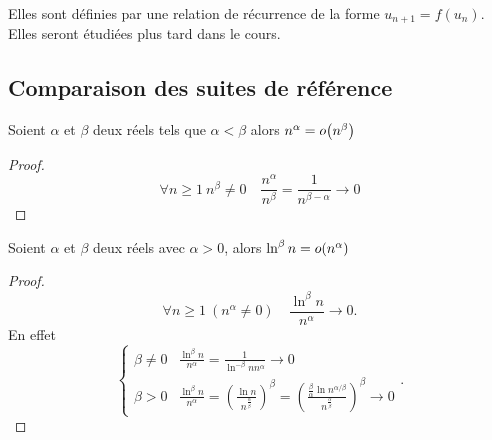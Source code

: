 Elles sont définies par une relation de récurrence de la forme \(u_{n+1}=f(u_n)\). Elles seront étudiées plus tard dans le cours.

\subsection{Comparaison des suites de référence}

\begin{prop}
  Soient \(\alpha\) et \(\beta\) deux réels tels que \(\alpha < \beta\) alors \(n^\alpha = o\mathopen{}\left(n^\beta\right)\)
\end{prop}
\begin{proof}
  \begin{equation}
    \forall n \geqslant 1 \ n^\beta \neq 0 \quad \frac{n^\alpha}{n^\beta}=\frac{1}{n^{\beta-\alpha}} \rightarrow 0
  \end{equation}
\end{proof}

\begin{prop}
  Soient \(\alpha\) et \(\beta\) deux réels avec \(\alpha>0\), alors \(\ln^\beta n = o\mathopen{}\left(n^\alpha\right)\)
\end{prop}
\begin{proof}
  \begin{equation}
    \forall n \geqslant 1 \ (n^\alpha \neq 0) \quad \frac{\ln^\beta n}{n^\alpha} \rightarrow 0.
  \end{equation}
En effet
\begin{equation}
  \begin{cases}
    \beta \neq 0 & \frac{\ln^\beta n}{n^\alpha}=\frac{1}{\ln^{-\beta} n n^\alpha} \rightarrow 0 \\
    \beta > 0 & \frac{\ln^\beta n}{n^\alpha} = \left(\frac{\ln n}{n^{\frac{\alpha}{\beta}}}\right)^\beta = \left(\frac{\frac{\beta}{\alpha}\ln n^{\alpha/\beta}}{n^{\frac{\alpha}{\beta}}}\right)^\beta \rightarrow 0
  \end{cases}.
\end{equation}
\end{proof}

